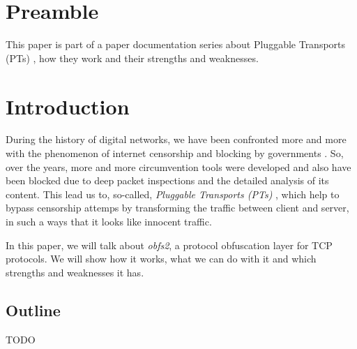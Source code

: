 \documentclass[sigconf, screen]{acmart}
\begin{document}
\maketitle

\section*{Preamble}
\label{s:preamble}
This paper is part of a paper documentation series about Pluggable Transports (PTs) \cite{TorPluggableTransports}, how they work and their strengths and weaknesses.
\section{Introduction}
\label{s:introduction}
During the history of digital networks, we have been confronted more and more with the phenomenon of internet censorship and blocking by governments \cite{foci12-winter}. So, over the years, more and more circumvention tools were developed and also have been blocked due to deep packet inspections and the detailed analysis of its content. This lead us to, so-called, \textit{Pluggable Transports (PTs)} \cite{TorPluggableTransports}, which help to bypass censorship attemps by transforming the traffic between client and server, in such a ways that it looks like innocent traffic.

In this paper, we will talk about \textit{obfs2}, a protocol obfuscation layer for TCP protocols. We will show how it works, what we can do with it and which strengths and weaknesses it has.
\subsection{Outline}
\label{ss:outline}
TODO
\end{document}
